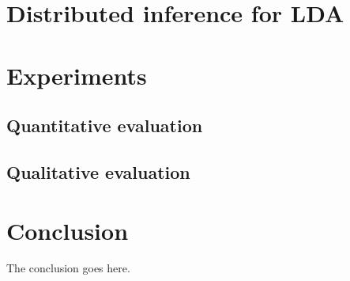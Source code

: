 \documentclass[journal]{IEEEtran}
\begin{document}
\section{Distributed inference for LDA}

\section{Experiments}

\subsection{Quantitative evaluation}
\subsection{Qualitative evaluation}






\section{Conclusion}
The conclusion goes here.








\end{document}
